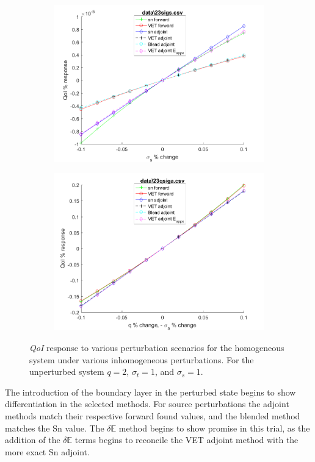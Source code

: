 \documentclass[12pt]{report}
\newcommand{\Edd}{\mathbb{E}}
\newcommand{\sigt}{\sigma_t}
\newcommand{\sigs}{\sigma_s}
\newcommand{\qoi}{{\it QoI}\xspace}
\begin{document}
\begin{figure}[H]
\begin{subfigure}{.5\textwidth}
  \includegraphics[width=.98\linewidth]{figures2/23sigsSens.png}
  \label{T2:sfig3}
\end{subfigure}%
\begin{subfigure}{.5\textwidth}
  \centering
  \includegraphics[width=.98\linewidth]{figures2/23qsigaSens.png}
  \label{T2:sfig4}
\end{subfigure}
\caption{\qoi response to various perturbation scenarios for the homogeneous system under various inhomogeneous perturbations. For the unperturbed system $q=2$, $\sigt=1$, and $\sigs=1$.}
\end{figure}

The introduction of the boundary layer in the perturbed state begins to show differentiation in the selected methods. For source perturbations the adjoint methods match their respective forward found values, and the blended method matches the Sn value. The $\delta \Edd$ method begins to show promise in this trial, as the addition of the $\delta \Edd$ terms begins to reconcile the VET adjoint method with the more exact Sn adjoint. 
\end{document}
